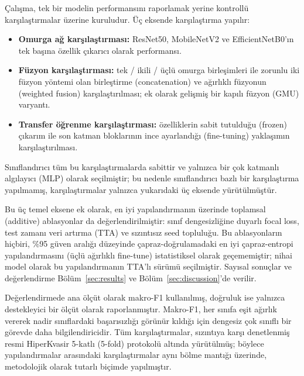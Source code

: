 Çalışma, tek bir modelin performansını raporlamak yerine kontrollü
karşılaştırmalar üzerine kuruludur. Üç eksende karşılaştırma yapılır:
\begin{itemize}
  \item \textbf{Omurga ağ karşılaştırması:} ResNet50, MobileNetV2 ve
        EfficientNetB0'ın tek başına özellik çıkarıcı olarak performansı.
  \item \textbf{Füzyon karşılaştırması:} tek / ikili / üçlü omurga
        birleşimleri ile zorunlu iki füzyon yöntemi olan birleştirme
        (concatenation) ve ağırlıklı füzyonun (weighted fusion)
        karşılaştırılması; ek olarak gelişmiş bir kapılı füzyon (GMU) varyantı.
  \item \textbf{Transfer öğrenme karşılaştırması:} özelliklerin sabit tutulduğu
        (frozen) çıkarım ile son katman bloklarının ince ayarlandığı
        (fine-tuning) yaklaşımın karşılaştırılması.
\end{itemize}
Sınıflandırıcı tüm bu karşılaştırmalarda sabittir ve yalnızca bir çok katmanlı
algılayıcı (MLP) olarak seçilmiştir; bu nedenle sınıflandırıcı bazlı bir
karşılaştırma yapılmamış, karşılaştırmalar yalnızca yukarıdaki üç eksende
yürütülmüştür.

Bu üç temel eksene ek olarak, en iyi yapılandırmanın üzerinde toplamsal
(additive) ablasyonlar da değerlendirilmiştir: sınıf dengesizliğine duyarlı
focal loss, test zamanı veri artırma (TTA) ve sızıntısız seed topluluğu. Bu
ablasyonların hiçbiri, \%95 güven aralığı düzeyinde çapraz-doğrulamadaki en iyi
çapraz-entropi yapılandırmasını (üçlü ağırlıklı fine-tune) istatistiksel olarak
geçememiştir; nihai model olarak bu yapılandırmanın TTA'lı sürümü seçilmiştir.
Sayısal sonuçlar ve değerlendirme Bölüm~\ref{sec:results} ve
Bölüm~\ref{sec:discussion}'de verilir.

Değerlendirmede ana ölçüt olarak makro-F1 kullanılmış, doğruluk ise yalnızca
destekleyici bir ölçüt olarak raporlanmıştır. Makro-F1, her sınıfa eşit ağırlık
vererek nadir sınıflardaki başarısızlığı görünür kıldığı için dengesiz çok
sınıflı bir görevde daha bilgilendiricidir. Tüm karşılaştırmalar, sızıntıya
karşı denetlenmiş resmi HiperKvasir 5-katlı (5-fold) protokolü altında
yürütülmüş; böylece yapılandırmalar arasındaki karşılaştırmalar aynı bölme
mantığı üzerinde, metodolojik olarak tutarlı biçimde yapılmıştır.

